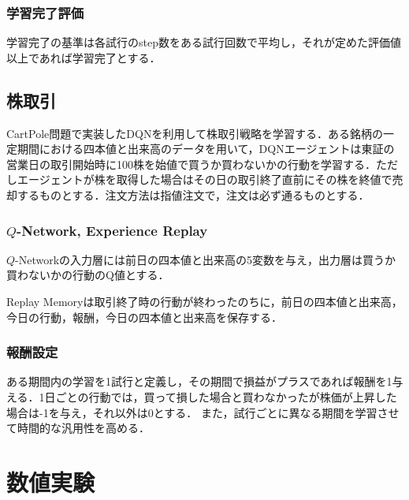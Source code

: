 \documentclass[twocolumn]{jarticle}
\begin{document}
        \subsubsection{学習完了評価}
        学習完了の基準は各試行のstep数をある試行回数で平均し，それが定めた評価値以上であれば学習完了とする．
    
    \subsection{株取引}
    CartPole問題で実装したDQNを利用して株取引戦略を学習する．ある銘柄の一定期間における四本値と出来高のデータを用いて，DQNエージェントは東証の営業日の取引開始時に100株を始値で買うか買わないかの行動を学習する．ただしエージェントが株を取得した場合はその日の取引終了直前にその株を終値で売却するものとする．注文方法は指値注文で，注文は必ず通るものとする．
        \subsubsection{$Q$-Network, Experience Replay}
        $Q$-Networkの入力層には前日の四本値と出来高の5変数を与え，出力層は買うか買わないかの行動のQ値とする．
        
        Replay Memoryは取引終了時の行動が終わったのちに，前日の四本値と出来高，今日の行動，報酬，今日の四本値と出来高を保存する．

        \subsubsection{報酬設定}
        ある期間内の学習を1試行と定義し，その期間で損益がプラスであれば報酬を1与える．1日ごとの行動では，買って損した場合と買わなかったが株価が上昇した場合は-1を与え，それ以外は0とする． また，試行ごとに異なる期間を学習させて時間的な汎用性を高める．
\section{数値実験}
\end{document}
